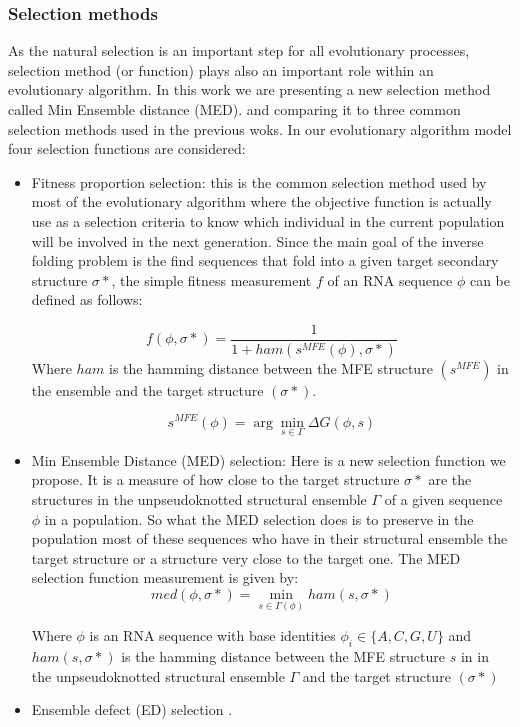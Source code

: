 \documentclass[english,12pt,a4paper]{article}
\theoremstyle{definition}
\begin{document}
\subsubsection{Selection methods}
	As the natural selection is an important step for all evolutionary processes, selection method (or function) plays also an important role within an evolutionary algorithm. In this work we are presenting a new selection method called Min Ensemble distance (MED). and comparing it to three common selection methods used in the previous woks. In our evolutionary algorithm model four selection functions are considered:  
\begin{itemize}
	\item  Fitness proportion selection: this is the common selection method used by most of the evolutionary algorithm where the objective function is actually use as a selection criteria to know which individual in the current population will be involved in the next generation. Since the main goal of the inverse folding problem is the find sequences that fold into a given target secondary structure $\sigma*$, the simple fitness measurement $f$ of an RNA sequence $\phi$ can be defined as follows:
	
	$$ 
		f(\phi, \sigma*) = \frac{1}{1 + ham(s^{MFE}(\phi) , \sigma*)}
	$$
	Where $ham$ is the hamming distance between the MFE structure $(s^{MFE})$ in the ensemble and the target structure $(\sigma*)$.
	
	$$
		s^{MFE}(\phi) = \arg \min_{s \in \Gamma}\Delta G(\phi, s) 
	$$
	\item Min Ensemble Distance (MED) selection: Here is a new selection function we propose. It is a measure of how close to the target structure $\sigma*$ are the structures in the unpseudoknotted structural ensemble $ \Gamma$ of a given sequence $\phi$ in a population. So what the MED selection does is to preserve in the population most of these  sequences who have in their structural ensemble the target structure or a structure very close to the target one. The  MED selection function measurement is given by:
 	$$
	med(\phi, \sigma*) = \min_{s \in \Gamma(\phi)} ham(s, \sigma*)
	$$
	
	Where $\phi$ is an RNA sequence with base identities $\phi_i \in \big \{ A,C,G, U \big \}$ and $ham(s , \sigma*)$ is the hamming distance between the MFE structure $s$ in in the unpseudoknotted structural ensemble $ \Gamma$ and the target structure $(\sigma*)$
		\item Ensemble defect (ED) selection \cite{zadeh2011nucleic}.
	

\end{itemize}
\end{document}
